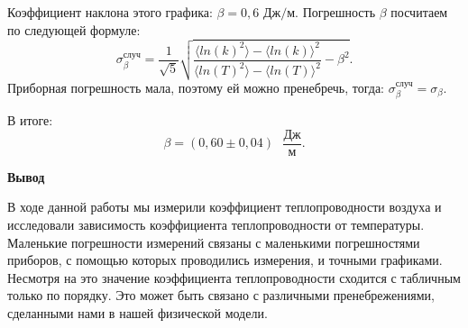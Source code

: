\documentclass[a4paper, 12pt]{article}
\begin{document}
\begin{enumerate}
        Коэффициент наклона этого графика: $\beta = 0,6$ $Дж / м$. Погрешность $\beta$ посчитаем по следующей формуле:
        \begin{equation}
            \sigma_{\beta}^{случ} = \frac{1}{\sqrt{5}} \sqrt{\frac{\langle ln(k)^2 \rangle - \langle ln(k) \rangle^2}{\langle ln(T)^2 \rangle - \langle ln(T) \rangle^2} - \beta^2}.
        \end{equation}
        Приборная погрешность мала, поэтому ей можно пренебречь, тогда: $\sigma_{\beta}^{случ} = \sigma_{\beta}$.
        
        В итоге:
        \begin{equation}
            \beta = (0,60 \pm 0,04) \text{ } \frac{Дж}{м}.
        \end{equation}
        
    \end{enumerate}
    
    \vspace{0.5cm}
    
    \begin{center}
        {\Large {\bf Вывод}}
    \end{center}
    
    \noindent В ходе данной работы мы измерили коэффициент теплопроводности воздуха и исследовали зависимость коэффициента теплопроводности от температуры. Маленькие погрешности измерений связаны с маленькими погрешностями приборов, с помощью которых проводились измерения, и точными графиками. Несмотря на это значение коэффициента теплопроводности сходится с табличным только по порядку. Это может быть связано с различными пренебрежениями, сделанными нами в нашей физической модели.
\end{document}
